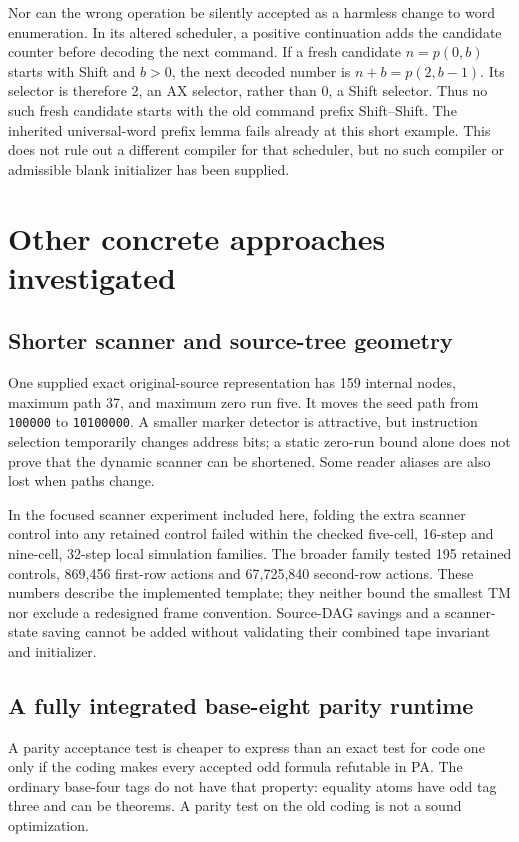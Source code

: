 \documentclass[11pt,a4paper]{article}
\begin{document}
Nor can the wrong operation be silently accepted as a harmless change to
word enumeration. In its altered scheduler, a positive continuation adds
the candidate counter before decoding the next command. If a fresh
candidate $n=p(0,b)$ starts with Shift and $b>0$, the next decoded number
is $n+b=p(2,b-1)$. Its selector is therefore 2, an AX selector, rather than
0, a Shift selector. Thus no such fresh candidate starts with the old
command prefix Shift--Shift. The inherited universal-word prefix lemma
fails already at this short example. This does not rule out a different
compiler for that scheduler, but no such compiler or admissible blank
initializer has been supplied.

\section{Other concrete approaches investigated}

\subsection{Shorter scanner and source-tree geometry}

One supplied exact original-source representation has 159 internal nodes,
maximum path 37, and maximum zero run five. It moves the seed path from
\texttt{100000} to \texttt{10100000}. A smaller marker detector is attractive,
but instruction selection temporarily changes address bits; a static
zero-run bound alone does not prove that the dynamic scanner can be shortened.
Some reader aliases are also lost when paths change.

In the focused scanner experiment included here, folding the extra scanner
control into any retained control failed within the checked five-cell,
16-step and nine-cell, 32-step local simulation families. The broader
family tested 195 retained controls, 869,456 first-row actions and
67,725,840 second-row actions. These numbers describe the implemented
template; they neither bound the smallest TM nor exclude a redesigned
frame convention. Source-DAG savings and a scanner-state saving cannot be
added without validating their combined tape invariant and initializer.

\subsection{A fully integrated base-eight parity runtime}

A parity acceptance test is cheaper to express than an exact test for code
one only if the coding makes every accepted odd formula refutable in PA.
The ordinary base-four tags do not have that property: equality atoms have
odd tag three and can be theorems. A parity test on the old coding is not
a sound optimization.
\end{document}
